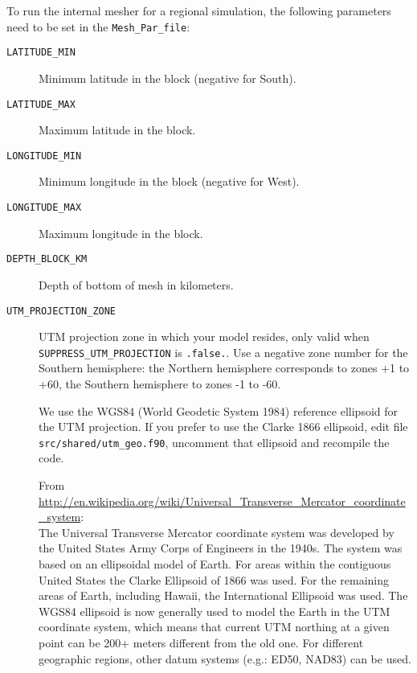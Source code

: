 \noindent
To run the
internal mesher for a regional simulation, the following parameters need to be
set in the \texttt{\small Mesh\_Par\_file}:
%
\begin{description}
\item [{\texttt{LATITUDE\_MIN}}] Minimum latitude in the block (negative
for South).
\item [{\texttt{LATITUDE\_MAX}}] Maximum latitude in the block.
\item [{\texttt{LONGITUDE\_MIN}}] Minimum longitude in the block (negative
for West).
\item [{\texttt{LONGITUDE\_MAX}}] Maximum longitude in the block.
\item [{\texttt{DEPTH\_BLOCK\_KM}}] Depth of bottom of mesh in kilometers.
\item [{\texttt{UTM\_PROJECTION\_ZONE}}] UTM projection zone in
which your model resides, only valid when
\texttt{SUPPRESS\_UTM\_PROJECTION} is \texttt{.false.}.
Use a negative zone number for the Southern hemisphere:
the Northern hemisphere corresponds to zones +1 to +60,
the Southern hemisphere to zones -1 to -60.


We use the WGS84 (World Geodetic System 1984) reference ellipsoid for the UTM projection. If you prefer to use the Clarke 1866 ellipsoid,
edit file \texttt{src/shared/utm\_geo.f90}, uncomment that ellipsoid and recompile the code.

From \url{http://en.wikipedia.org/wiki/Universal_Transverse_Mercator_coordinate_system}:\\
The Universal Transverse Mercator coordinate system was developed by the United States Army Corps of Engineers in the 1940s.
The system was based on an ellipsoidal model of Earth. For areas within the contiguous United States
the Clarke Ellipsoid of 1866 was used. For the remaining areas of Earth, including Hawaii, the International Ellipsoid was used.
The WGS84 ellipsoid is now generally used to model the Earth in the UTM coordinate system,
which means that current UTM northing at a given point can be 200+ meters different from the old one.
For different geographic regions, other datum systems (e.g.: ED50, NAD83) can be used.


\end{description}

